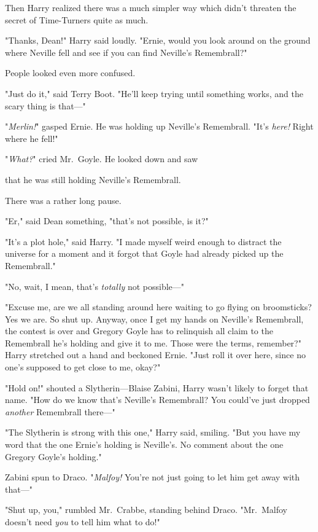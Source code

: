 Then Harry realized there was a much simpler way which didn't threaten the
secret of Time-Turners quite as much.

"Thanks, Dean!" Harry said loudly. "Ernie, would you look around on the ground
where Neville fell and see if you can find Neville's Remembrall?"

People looked even more confused.

"Just do it," said Terry Boot. "He'll keep trying until something works, and
the scary thing is that\mbox{---}"

"\emph{Merlin!}" gasped Ernie. He was holding up Neville's Remembrall. "It's
\emph{here!} Right where he fell!"

"\emph{What?}" cried Mr.~Goyle. He looked down and saw{\el}

{\el} that he was still holding Neville's Remembrall.

There was a rather long pause.

"Er," said Dean something, "that's not possible, is it?"

"It's a plot hole," said Harry. "I made myself weird enough to distract the
universe for a moment and it forgot that Goyle had already picked up the
Remembrall."

"No, wait, I mean, that's \emph{totally} not possible\mbox{---}"

"Excuse me, are we all standing around here waiting to go flying on
broomsticks? Yes we are. So shut up. Anyway, once I get my hands on Neville's
Remembrall, the contest is over and Gregory Goyle has to relinquish all claim
to the Remembrall he's holding and give it to me. Those were the terms,
remember?" Harry stretched out a hand and beckoned Ernie. "Just roll it over
here, since no one's supposed to get close to me, okay?"

"Hold on!" shouted a Slytherin---Blaise Zabini, Harry wasn't likely to forget
that name. "How do we know that's Neville's Remembrall? You could've just
dropped \emph{another} Remembrall there\mbox{---}"

"The Slytherin is strong with this one," Harry said, smiling. "But you have my
word that the one Ernie's holding is Neville's. No comment about the one
Gregory Goyle's holding."

Zabini spun to Draco. "\emph{Malfoy!} You're not just going to let him get away
with that\mbox{---}"

"Shut up, you," rumbled Mr.~Crabbe, standing behind Draco. "Mr.~Malfoy doesn't
need \emph{you} to tell him what to do!"

